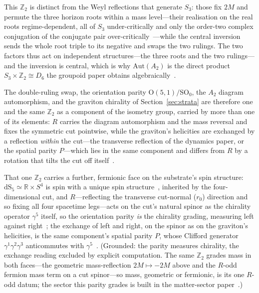 \documentclass[11pt,a4paper]{article}
\theoremstyle{plain}
\theoremstyle{definition}
\theoremstyle{remark}
\newcommand{\dS}{\mathrm{dS}}
\begin{document}
This $\mathbb{Z}_2$ is distinct from the Weyl reflections that generate $S_3$: those fix $2M$ and permute the three horizon roots within a mass level---their realisation on the real roots regime-dependent, all of $S_3$ under-critically and only the order-two complex conjugation of the conjugate pair over-critically~\cite{JanzenGroupoid}---while the central inversion sends the whole root triple to its negative and swaps the two rulings. The two factors thus act on independent structures---the three roots and the two rulings---and the inversion is central, which is why $\mathrm{Aut}(A_2)$ is the direct product $S_3\times\mathbb{Z}_2\cong D_6$ the groupoid paper obtains algebraically~\cite{JanzenGroupoid}. 

The double-ruling swap, the orientation parity $\mathrm{O}(5,1)/\mathrm{SO}_0$, the $A_2$ diagram automorphism, and the graviton chirality of Section~\ref{sec:strata} are therefore one and the same $\mathbb{Z}_2$ as a component of the isometry group, carried by more than one of its elements: $R$ carries the diagram automorphism and the mass reversal and fixes the symmetric cut pointwise, while the graviton's helicities are exchanged by a reflection \emph{within} the cut---the transverse reflection of the dynamics paper, or the spatial parity $P$---which lies in the same component and differs from $R$ by a rotation that tilts the cut off itself~\cite{JanzenDynamics,JanzenMatter}. 

That one $\mathbb{Z}_2$ carries a further, fermionic face on the substrate's spin structure: $\dS_5\simeq\mathbb{R}\times S^4$ is spin with a unique spin structure~\cite{LawsonMichelsohn1989}, inherited by the four-dimensional cut, and $R$---reflecting the transverse cut-normal ($r_0$) direction and so fixing all four spacetime legs---acts on the cut's natural spinor as the chirality operator $\gamma^5$ itself, so the orientation parity \emph{is} the chirality grading, measuring left against right~\cite{JanzenGeometricCore}; the exchange of left and right, on the spinor as on the graviton's helicities, is the same component's spatial parity $P$, whose Clifford generator $\gamma^{1}\gamma^{2}\gamma^{3}$ anticommutes with $\gamma^{5}$~\cite{JanzenBoundary,JanzenMatter}. (Grounded: the parity measures chirality, the exchange reading excluded by explicit computation. The same $\mathbb{Z}_2$ grades mass in both faces---the geometric mass-reflection $2M\mapsto-2M$ above and the $R$-odd fermion mass term on a cut spinor---so mass, geometric or fermionic, is its one $R$-odd datum; the sector this parity grades is built in the matter-sector paper~\cite{JanzenMatter}.) 
\end{document}
